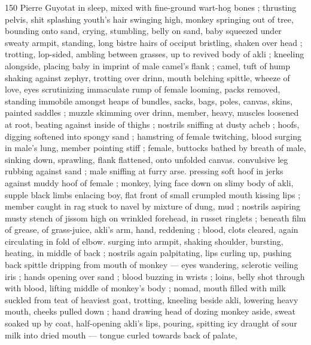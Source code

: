 150 Pierre Guyotat
in sleep, mixed with fine-ground wart-hog bones ; thrusting pelvis,
shit splashing youth's hair swinging high, monkey springing out of
tree, bounding onto sand, crying, stumbling, belly on sand, baby
squeezed under sweaty armpit, standing, long bistre hairs of occiput
bristling, shaken over head ; trotting, lop-sided, ambling between
grasses, up to revived body of akli ; kneeling alongside, placing baby
in imprint of male camel's flank ; camel, tuft of hump shaking against
zephyr, trotting over drinn, mouth belching spittle, wheeze of love,
eyes scrutinizing immaculate rump of female looming, packs
removed, standing immobile amongst heaps of bundles, sacks, bags,
poles, canvas, skins, painted saddles ; muzzle skimming over drinn,
member, heavy, muscles loosened at root, beating against inside of
thighs ; nostrils sniffing at dusty acheb ; hoofs, digging softened into
spongy sand ; hamstring of female twitching, blood surging in male's
lung, member pointing stiff ; female, buttocks bathed by breath of
male, sinking down, sprawling, flank flattened, onto unfolded canvas.
convulsive leg rubbing against sand ; male sniffing at furry arse.
pressing soft hoof in jerks against muddy hoof of female ; monkey,
lying face down on slimy body of akli, supple black limbs enlacing
boy, flat front of small crumpled mouth kissing lips ; member caught
in rag stuck to navel by mixture of dung, mud ; nostrils aspiring
musty stench of jissom high on wrinkled forehead, in russet ringlets
; beneath film of grease, of grass-juice, akli's arm, hand, reddening
; blood, clots cleared, again circulating in fold of elbow. surging into
armpit, shaking shoulder, bursting, heating, in middle of back ;
nostrils again palpitating, lips curling up, pushing back spittle
dripping from mouth of monkey — eyes wandering, sclerotic veiling
iris ; hands opening over sand ; blood buzzing in wrists ; loins, belly
shot through with blood, lifting middle of monkey's body ; nomad,
mouth filled with milk suckled from teat of heaviest goat, trotting,
kneeling beside akli, lowering heavy mouth, cheeks pulled down ;
hand drawing head of dozing monkey aside, sweat soaked up by
coat, half-opening akli’s lips, pouring, spitting icy draught of sour
milk into dried mouth — tongue curled towards back of palate,

